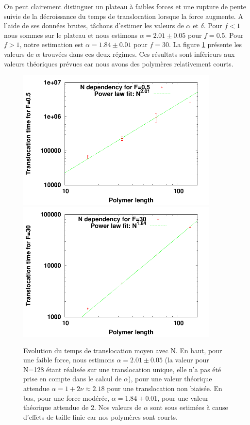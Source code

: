 On peut clairement distinguer un plateau à faibles forces et une rupture de pente suivie de la décroissance du temps de translocation lorsque la force augmente. A l'aide de ses données brutes, tâchons d'estimer les valeurs de $\alpha$ et $\delta$. Pour $f<1$ nous sommes sur le plateau et nous estimons $\alpha=2.01 \pm 0.05$ pour $f=0.5$. Pour $f>1$, notre estimation est $\alpha=1.84 \pm 0.01$ pour $f=30$. La figure \ref{ndeppolsimple} présente les valeurs de $\alpha$ trouvées dans ces deux régimes. Ces résultats sont inférieurs aux valeurs théoriques prévues car nous avons des polymères relativement courts.

\newpage


\begin{figure}[H]
\begin{center}
\includegraphics[width=0.9\textwidth]{ndeppolsimplef05.pdf}
\includegraphics[width=0.9\textwidth]{ndeppolsimplef30.pdf}

\caption[Temps de translocations en fonction de N]{Evolution du temps de translocation moyen avec N. En haut, pour une faible force, nous estimons $\alpha=2.01 \pm 0.05 $ (la valeur pour N=128 étant réalisée sur une translocation unique, elle n'a pas été prise en compte dans le calcul de $\alpha$), pour une valeur théorique attendue $\alpha=1+2\nu \approx 2.18$ pour une translocation non biaisée. En bas, pour une force modérée, $\alpha= 1.84 \pm 0.01$, pour une valeur théorique attendue de 2. Nos valeurs de $\alpha$ sont sous estimées à cause d'effets de taille finie car nos polymères sont courts.}
\label{ndeppolsimple}
\end{center}
\end{figure}


